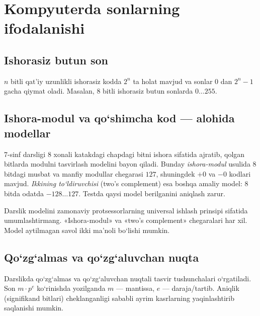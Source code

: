 \documentclass[11pt,a4paper,openany,oneside]{book}
\begin{document}
\chapter{Kompyuterda sonlarning ifodalanishi}
\section{Ishorasiz butun son}
\(n\) bitli qat’iy uzunlikli ishorasiz kodda \(2^n\) ta holat mavjud va sonlar \(0\) dan \(2^n-1\) gacha qiymat oladi. Masalan, 8 bitli ishorasiz butun sonlarda \(0\ldots255\). 
\section{Ishora-modul va qo‘shimcha kod — alohida modellar}
7-sinf darsligi 8 xonali katakdagi chapdagi bitni ishora sifatida ajratib, qolgan bitlarda modulni tasvirlash modelini bayon qiladi. Bunday \emph{ishora-modul} usulida 8 bitdagi musbat va manfiy modullar chegarasi \(127\), shuningdek \(+0\) va \(-0\) kodlari mavjud. \emph{Ikkining to‘ldiruvchisi} (two's complement) esa boshqa amaliy model: 8 bitda odatda \(-128\ldots127\). Testda qaysi model berilganini aniqlash zarur. 
\begin{important}
Darslik modelini zamonaviy protsessorlarning universal ishlash prinsipi sifatida umumlashtirmang. «Ishora-modul» va «two's complement» chegaralari har xil. Model aytilmagan savol ikki ma’noli bo‘lishi mumkin.
\end{important}
\section{Qo‘zg‘almas va qo‘zg‘aluvchan nuqta}
Darslikda qo‘zg‘almas va qo‘zg‘aluvchan nuqtali tasvir tushunchalari o‘rgatiladi. Son \(m\cdot p^e\) ko‘rinishda yozilganda \(m\) — mantissa, \(e\) — daraja/tartib. Aniqlik (signifikand bitlari) cheklanganligi sababli ayrim kasrlarning yaqinlashtirib saqlanishi mumkin. 
\end{document}

